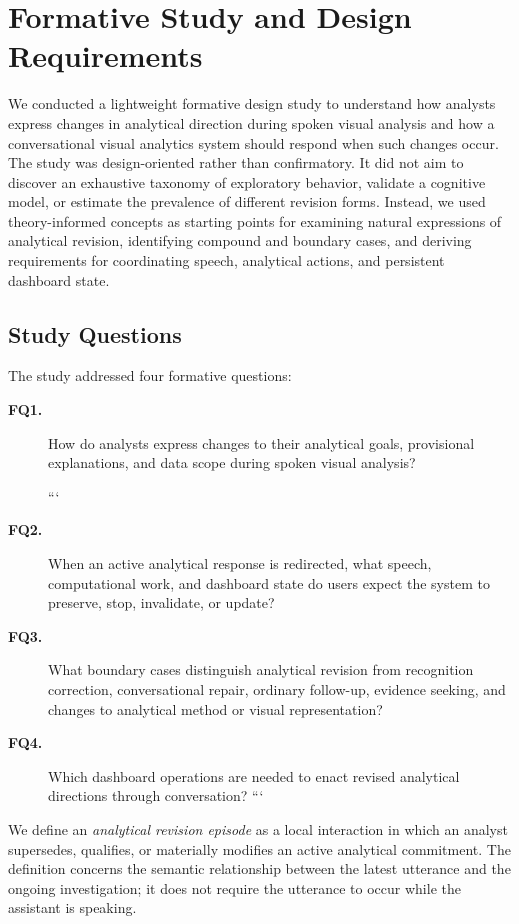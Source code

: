 \documentclass[journal]{IEEEtran}
\begin{document}
\section{Formative Study and Design Requirements}
\label{sec:formative}

We conducted a lightweight formative design study to understand how analysts
express changes in analytical direction during spoken visual analysis and how
a conversational visual analytics system should respond when such changes
occur. The study was design-oriented rather than confirmatory. It did not aim
to discover an exhaustive taxonomy of exploratory behavior, validate a
cognitive model, or estimate the prevalence of different revision forms.
Instead, we used theory-informed concepts as starting points for examining
natural expressions of analytical revision, identifying compound and boundary
cases, and deriving requirements for coordinating speech, analytical actions,
and persistent dashboard state.

\subsection{Study Questions}
\label{sec:formative-questions}

The study addressed four formative questions:

\begin{description}
\item[\textbf{FQ1.}]
How do analysts express changes to their analytical goals, provisional
explanations, and data scope during spoken visual analysis?

```
\item[\textbf{FQ2.}]
When an active analytical response is redirected, what speech,
computational work, and dashboard state do users expect the system to
preserve, stop, invalidate, or update?

\item[\textbf{FQ3.}]
What boundary cases distinguish analytical revision from recognition
correction, conversational repair, ordinary follow-up, evidence seeking,
and changes to analytical method or visual representation?

\item[\textbf{FQ4.}]
Which dashboard operations are needed to enact revised analytical
directions through conversation?
```

\end{description}

We define an \emph{analytical revision episode} as a local interaction in
which an analyst supersedes, qualifies, or materially modifies an active
analytical commitment. The definition concerns the semantic relationship
between the latest utterance and the ongoing investigation; it does not require
the utterance to occur while the assistant is speaking.
\end{document}
